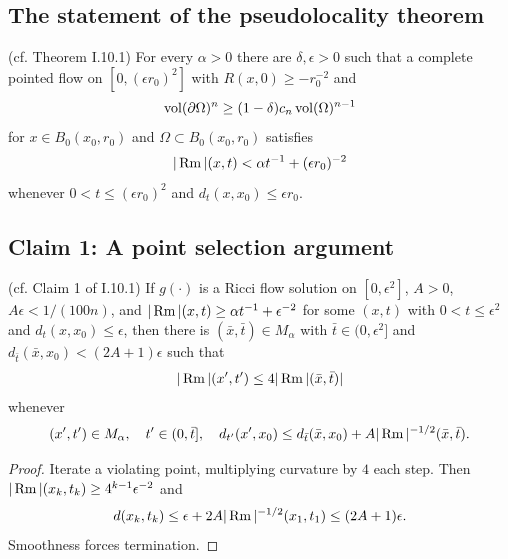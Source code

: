 \subsection{The statement of the pseudolocality theorem}
\label{statement of I.10.1}
\begin{theorem}
  \label{thm:kl-statement-pseudolocality-theorem-pseudolocality-theorem}
  (cf. Theorem I.10.1) \label{thmI.10.1}
For every $\alpha>0$ there are $\delta,\epsilon>0$ such that a complete pointed
flow on $[0,(\epsilon r_0)^2]$ with
$R(x,0)\ge-r_0^{-2}$ and
\begin{equation}
\operatorname{vol}(\partial\Omega)^n\ge(1-\delta)c_n\operatorname{vol}(\Omega)^{n-1}
\end{equation}
for $x\in B_0(x_0,r_0)$ and $\Omega\subset B_0(x_0,r_0)$ satisfies
\begin{equation}
|\operatorname{Rm}|(x,t)<\alpha t^{-1}+(\epsilon r_0)^{-2}
\end{equation}
whenever $0<t\le(\epsilon r_0)^2$ and $d_t(x,x_0)\le\epsilon r_0$.
\end{theorem}

\subsection{Claim 1: A point selection argument}
\begin{lemma}
  \label{lem:kl-point-selection-argument-point-selection-argument-lemma}


  (cf. Claim 1 of I.10.1) \label{Claim 1}
If $g(\cdot)$ is a Ricci flow solution on $[0,\epsilon^2]$, $A>0$,
$A\epsilon<1/(100n)$, and
$|\operatorname{Rm}|(x,t)\ge\alpha t^{-1}+\epsilon^{-2}$ for some $(x,t)$ with
$0<t\le\epsilon^2$ and $d_t(x,x_0)\le\epsilon$, then there is
$(\bar x,\bar t)\in M_\alpha$ with $\bar t\in(0,\epsilon^2]$ and
$d_{\bar t}(\bar x,x_0)<(2A+1)\epsilon$ such that
\begin{equation}\label{I.(10.1)}|\operatorname{Rm}|(x',t')\le4|\operatorname{Rm}|(\bar x,\bar t)|\end{equation}
whenever
\begin{equation}\label{I.(10.2)}(x',t')\in M_\alpha,\quad t'\in(0,\bar t],\quad
d_{t'}(x',x_0)\le d_{\bar t}(\bar x,x_0)+A|\operatorname{Rm}|^{-1/2}(\bar x,\bar t).
\end{equation}
\end{lemma}
\begin{proof}
\sketch
Iterate a violating point, multiplying curvature by $4$ each step. Then
$|\operatorname{Rm}|(x_k,t_k)\ge4^{k-1}\epsilon^{-2}$ and
\begin{equation}d(x_k,t_k)\le\epsilon+2A|\operatorname{Rm}|^{-1/2}(x_1,t_1)\le(2A+1)\epsilon.
\end{equation}
Smoothness forces termination.
\end{proof}

